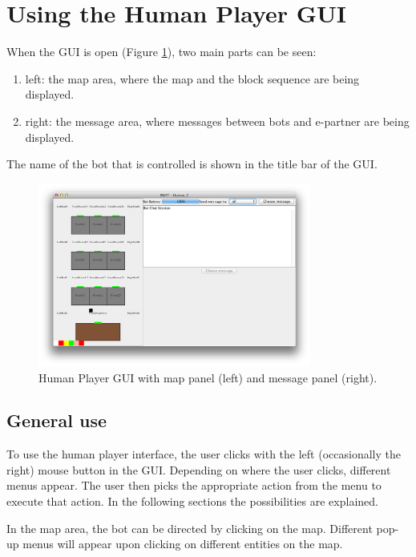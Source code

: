 
\section{Using the Human Player GUI}\label{ch:usingHI} 

When the GUI is open (Figure \ref{fig:humanPlayerGUI}), two main parts can be seen:
\begin{enumerate}
\item left: the map area, where the map and the block sequence are being displayed.
\item right: the message area, where messages between bots and e-partner are being displayed.
\end{enumerate}

The name of the bot that is controlled is shown in the title bar of the GUI.

\begin{figure}[h]
\begin{center}
\includegraphics[width = 0.8\textwidth]{HumanPlayerGUI/hpg.png}
\caption{Human Player GUI with map panel (left) and message panel (right).}
\label{fig:humanPlayerGUI}
\end{center}
\end{figure}

\subsection{General use}
To use the human player interface, the user clicks with the left (occasionally the right) mouse button in the GUI. Depending on where the user clicks, different menus appear. The user then picks the appropriate action from the menu to execute that action. In the following sections the possibilities are explained.

In the map area, the bot can be directed by clicking on the map. Different pop-up menus will appear upon clicking on different entities on the map.

